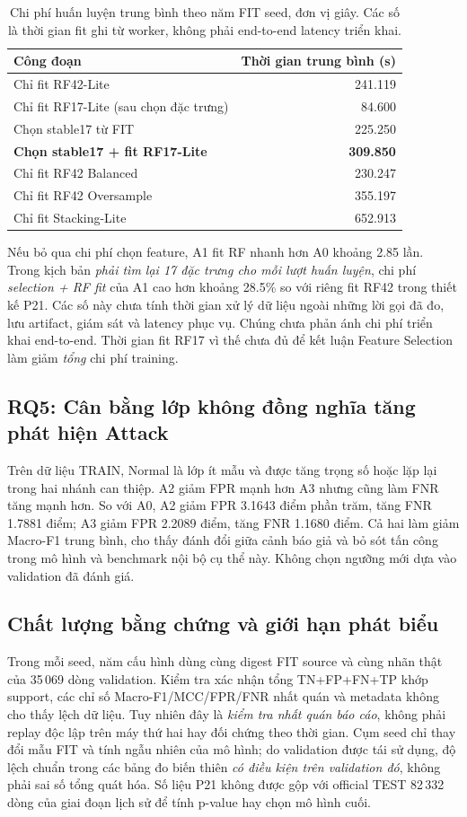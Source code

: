 \begin{table}[htbp]\centering\small
\renewcommand{\arraystretch}{1.22}
\caption{Chi phí huấn luyện trung bình theo năm FIT seed, đơn vị giây. Các số là thời gian fit ghi từ worker, không phải end-to-end latency triển khai.}
\label{tab:p21-cost}
\begin{tabular}{lr}\toprule
Công đoạn & Thời gian trung bình (s)\\\midrule
Chỉ fit RF42-Lite & 241.119\\
Chỉ fit RF17-Lite (sau chọn đặc trưng) & 84.600\\
Chọn stable17 từ FIT & 225.250\\
\textbf{Chọn stable17 + fit RF17-Lite} & \textbf{309.850}\\
Chỉ fit RF42 Balanced & 230.247\\
Chỉ fit RF42 Oversample & 355.197\\
Chỉ fit Stacking-Lite & 652.913\\\bottomrule
\end{tabular}
\end{table}
Nếu bỏ qua chi phí chọn feature, A1 fit RF nhanh hơn A0 khoảng 2.85 lần. Trong kịch bản \emph{phải tìm lại 17 đặc trưng cho mỗi lượt huấn luyện}, chi phí \emph{selection + RF fit} của A1 cao hơn khoảng 28.5\% so với riêng fit RF42 trong thiết kế P21. Các số này chưa tính thời gian xử lý dữ liệu ngoài những lời gọi đã đo, lưu artifact, giám sát và latency phục vụ. Chúng chưa phản ánh chi phí triển khai end-to-end. Thời gian fit RF17 vì thế chưa đủ để kết luận Feature Selection làm giảm \emph{tổng} chi phí training.

\subsection{RQ5: Cân bằng lớp không đồng nghĩa tăng phát hiện Attack}
Trên dữ liệu TRAIN, Normal là lớp ít mẫu và được tăng trọng số hoặc lặp lại trong hai nhánh can thiệp. A2 giảm FPR mạnh hơn A3 nhưng cũng làm FNR tăng mạnh hơn. So với A0, A2 giảm FPR 3.1643 điểm phần trăm, tăng FNR 1.7881 điểm; A3 giảm FPR 2.2089 điểm, tăng FNR 1.1680 điểm. Cả hai làm giảm Macro-F1 trung bình, cho thấy đánh đổi giữa cảnh báo giả và bỏ sót tấn công trong mô hình và benchmark nội bộ cụ thể này. Không chọn ngưỡng mới dựa vào validation đã đánh giá.

\subsection{Chất lượng bằng chứng và giới hạn phát biểu}
Trong mỗi seed, năm cấu hình dùng cùng digest FIT source và cùng nhãn thật của 35\,069 dòng validation. Kiểm tra xác nhận tổng TN+FP+FN+TP khớp support, các chỉ số Macro-F1/MCC/FPR/FNR nhất quán và metadata không cho thấy lệch dữ liệu. Tuy nhiên đây là \emph{kiểm tra nhất quán báo cáo}, không phải replay độc lập trên máy thứ hai hay đối chứng theo thời gian. Cụm seed chỉ thay đổi mẫu FIT và tính ngẫu nhiên của mô hình; do validation được tái sử dụng, độ lệch chuẩn trong các bảng đo biến thiên \emph{có điều kiện trên validation đó}, không phải sai số tổng quát hóa. Số liệu P21 không được gộp với official TEST 82\,332 dòng của giai đoạn lịch sử để tính p-value hay chọn mô hình cuối.
